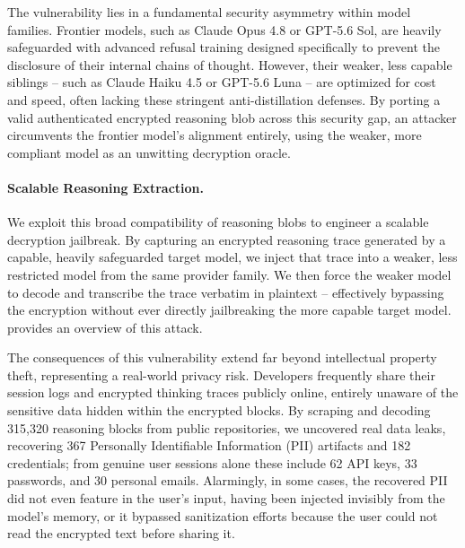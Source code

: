 The vulnerability lies in a fundamental security asymmetry within model families. Frontier models, such as Claude Opus 4.8 or GPT-5.6 Sol, are heavily safeguarded with advanced refusal training designed specifically to prevent the disclosure of their internal chains of thought. However, their weaker, less capable siblings -- such as Claude Haiku 4.5 or GPT-5.6 Luna -- are optimized for cost and speed, often lacking these stringent anti-distillation defenses. By porting a valid authenticated encrypted reasoning blob across this security gap, an attacker circumvents the frontier model's alignment entirely, using the weaker, more compliant model as an unwitting decryption oracle. 

\paragraph{Scalable Reasoning Extraction.} We exploit this broad compatibility of reasoning blobs to engineer a scalable decryption jailbreak. By capturing an encrypted reasoning trace generated by a capable, heavily safeguarded target model, we inject that trace into a weaker, less restricted model from the same provider family. We then force the weaker model to decode and transcribe the trace verbatim in plaintext -- effectively bypassing the encryption without ever directly jailbreaking the more capable target model.  provides an overview of this attack.  


 The consequences of this vulnerability extend far beyond intellectual property theft, representing a real-world privacy risk. Developers frequently share their session logs and encrypted thinking traces publicly online, entirely unaware of the sensitive data hidden within the encrypted blocks. By scraping and decoding 315,320 reasoning blocks from public repositories, we uncovered real data leaks, recovering 367 Personally Identifiable Information (PII) artifacts and 182 credentials; from genuine user sessions alone these include 62 API keys, 33 passwords, and 30 personal emails. Alarmingly, in some cases, the recovered PII did not even feature in the user's input, having been injected invisibly from the model's memory, or it bypassed sanitization efforts because the user could not read the encrypted text before sharing it.


